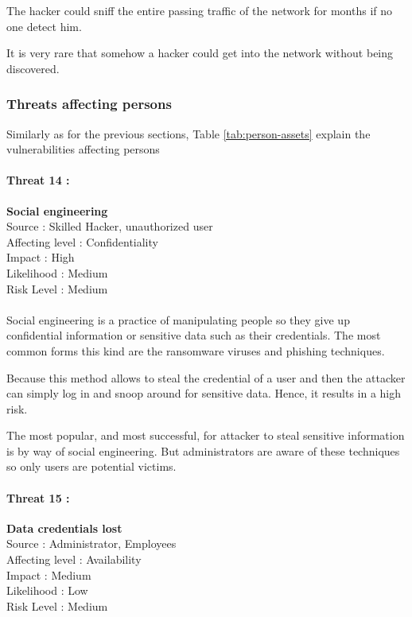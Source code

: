 \documentclass[a4paper,10pt]{article}
\begin{document}
The hacker could sniff the entire passing traffic of the network for months if no one detect him.

It is very rare that somehow a hacker could get into the network without being discovered.\\


\subsubsection{Threats affecting persons}
Similarly as for the previous sections, Table \ref{tab:person-assets} explain the vulnerabilities affecting persons

\paragraph{Threat 14 :} \textbf{Social engineering} \\ 
Source : Skilled Hacker, unauthorized user \\
Affecting level : Confidentiality  \\
Impact : High \\
Likelihood : Medium \\
Risk Level : Medium
\paragraph{}Social engineering is a practice of manipulating people so they give up confidential information or sensitive data such as their credentials. The most common forms this kind are the ransomware viruses and phishing techniques. 

Because this method allows to steal the credential of a user and then the attacker can simply log in and snoop around for sensitive data. Hence, it results in a high risk. 

The most popular, and most successful, for attacker to steal sensitive information is by way of social engineering. But administrators are aware of these techniques so only users are potential victims. \\

\paragraph{Threat 15 :} \textbf{Data credentials lost} \\ 
Source : Administrator, Employees  \\
Affecting level : Availability \\
Impact : Medium \\
Likelihood : Low \\
Risk Level : Medium
\end{document}
